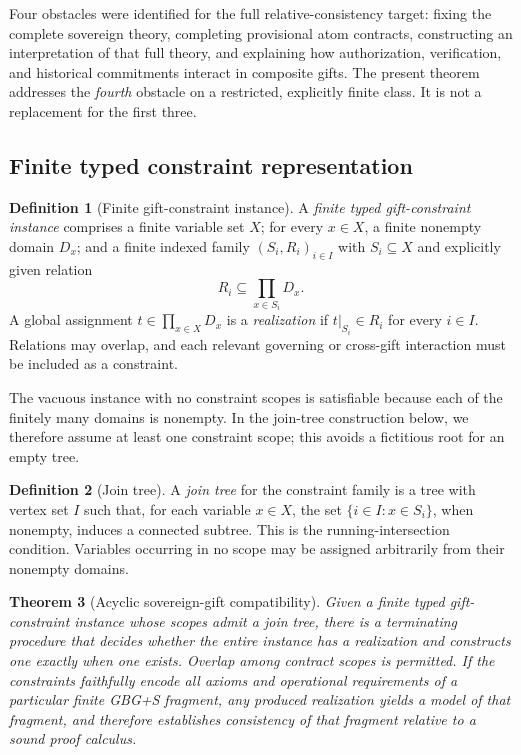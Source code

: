 \documentclass[11pt,letterpaper]{article}
\newtheorem{theorem}{Theorem}[section]
\theoremstyle{definition}\newtheorem{definition}[theorem]{Definition}\newtheorem{example}[theorem]{Example}
\theoremstyle{remark}\newtheorem{remark}[theorem]{Remark}
\begin{document}
Four obstacles were identified for the full relative-consistency target: fixing the complete sovereign theory, completing provisional atom contracts, constructing an interpretation of that full theory, and explaining how authorization, verification, and historical commitments interact in composite gifts. The present theorem addresses the \emph{fourth} obstacle on a restricted, explicitly finite class. It is not a replacement for the first three.

\subsection{Finite typed constraint representation}
\begin{definition}[Finite gift-constraint instance]
A \emph{finite typed gift-constraint instance} comprises a finite variable set \(X\); for every \(x\in X\), a finite nonempty domain \(D_x\); and a finite indexed family \((S_i,R_i)_{i\in I}\) with \(S_i\subseteq X\) and explicitly given relation
\[
R_i\subseteq\prod_{x\in S_i}D_x.
\]
A global assignment \(t\in\prod_{x\in X}D_x\) is a \emph{realization} if \(t|_{S_i}\in R_i\) for every \(i\in I\). Relations may overlap, and each relevant governing or cross-gift interaction must be included as a constraint.
\end{definition}

The vacuous instance with no constraint scopes is satisfiable because each of
the finitely many domains is nonempty. In the join-tree construction below,
we therefore assume at least one constraint scope; this avoids a fictitious
root for an empty tree.

\begin{definition}[Join tree]
A \emph{join tree} for the constraint family is a tree with vertex set \(I\) such that, for each variable \(x\in X\), the set \(\{i\in I:x\in S_i\}\), when nonempty, induces a connected subtree. This is the running-intersection condition. Variables occurring in no scope may be assigned arbitrarily from their nonempty domains.
\end{definition}

\begin{theorem}[Acyclic sovereign-gift compatibility]\label{compat:thm:main}
Given a finite typed gift-constraint instance whose scopes admit a join tree, there is a terminating procedure that decides whether the entire instance has a realization and constructs one exactly when one exists. Overlap among contract scopes is permitted. If the constraints faithfully encode \emph{all} axioms and operational requirements of a particular finite GBG+S fragment, any produced realization yields a model of that fragment, and therefore establishes consistency of that fragment relative to a sound proof calculus.
\end{theorem}
\end{document}
